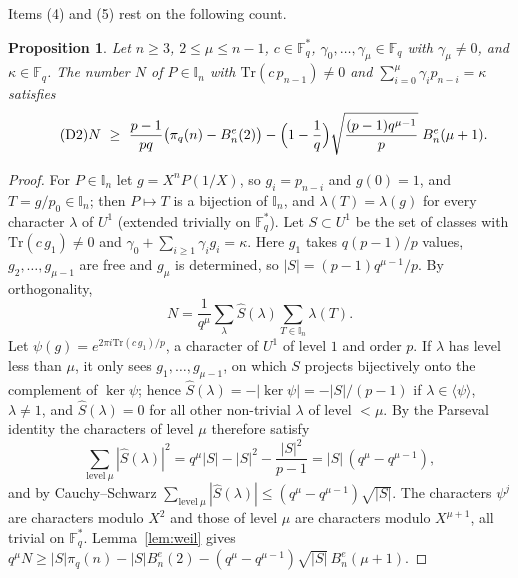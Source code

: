 \documentclass[11pt,a4paper]{amsart}
\newtheorem{proposition}[theorem]{Proposition}
\theoremstyle{remark}
\newcommand{\Fq}{\mathbb{F}_q}
\newcommand{\Tr}{\mathrm{Tr}}
\newcommand{\I}{\mathbb{I}}
\begin{document}
Items (4) and (5) rest on the following count.

\begin{proposition}\label{prop:D2}
Let $n\ge3$, $2\le\mu\le n-1$, $c\in\Fq^*$, $\gamma_0,\dots,\gamma_\mu\in\Fq$ with $\gamma_\mu\ne0$, and
$\kappa\in\Fq$. The number $N$ of $P\in\I_n$ with $\Tr(c\,p_{n-1})\ne0$ and $\sum_{i=0}^\mu\gamma_ip_{n-i}=\kappa$
satisfies
\begin{equation}\label{eq:D2}\tag{D2}
N\ \ge\ \frac{p-1}{pq}\bigl(\pi_q(n)-B^e_n(2)\bigr)-\Bigl(1-\frac1q\Bigr)\sqrt{\frac{(p-1)q^{\mu-1}}{p}}\;B^e_n(\mu+1).
\end{equation}
\end{proposition}
\begin{proof}
For $P\in\I_n$ let $g=X^nP(1/X)$, so $g_i=p_{n-i}$ and $g(0)=1$, and $T=g/p_0\in\I_n$; then $P\mapsto T$ is a
bijection of $\I_n$, and $\lambda(T)=\lambda(g)$ for every character $\lambda$ of $U^1$ (extended trivially on
$\Fq^*$). Let $S\subset U^1$ be the set of classes with $\Tr(c\,g_1)\ne0$ and
$\gamma_0+\sum_{i\ge1}\gamma_ig_i=\kappa$. Here $g_1$ takes $q(p-1)/p$ values, $g_2,\dots,g_{\mu-1}$ are free and
$g_\mu$ is determined, so $|S|=(p-1)q^{\mu-1}/p$. By orthogonality,
\[
N=\frac1{q^\mu}\sum_\lambda\widehat S(\lambda)\sum_{T\in\I_n}\lambda(T).
\]
Let $\psi(g)=e^{2\pi i\Tr(c\,g_1)/p}$, a character of $U^1$ of level $1$ and order $p$. If $\lambda$ has level
less than $\mu$, it only sees $g_1,\dots,g_{\mu-1}$, on which $S$ projects bijectively onto the complement of
$\ker\psi$; hence $\widehat S(\lambda)=-|\ker\psi|=-|S|/(p-1)$ if $\lambda\in\langle\psi\rangle$, $\lambda\ne1$,
and $\widehat S(\lambda)=0$ for all other non-trivial $\lambda$ of level $<\mu$. By the Parseval identity the
characters of level $\mu$ therefore satisfy
\[
\sum_{\mathrm{level}\ \mu}|\widehat S(\lambda)|^2=q^\mu|S|-|S|^2-\frac{|S|^2}{p-1}=|S|\,(q^\mu-q^{\mu-1}),
\]
and by Cauchy--Schwarz $\sum_{\mathrm{level}\ \mu}|\widehat S(\lambda)|\le(q^\mu-q^{\mu-1})\sqrt{|S|}$. The
characters $\psi^j$ are characters modulo $X^2$ and those of level $\mu$ are characters modulo $X^{\mu+1}$, all
trivial on $\Fq^*$. Lemma~\ref{lem:weil} gives
$q^\mu N\ge|S|\pi_q(n)-|S|B^e_n(2)-(q^\mu-q^{\mu-1})\sqrt{|S|}\,B^e_n(\mu+1)$.
\end{proof}
\end{document}
